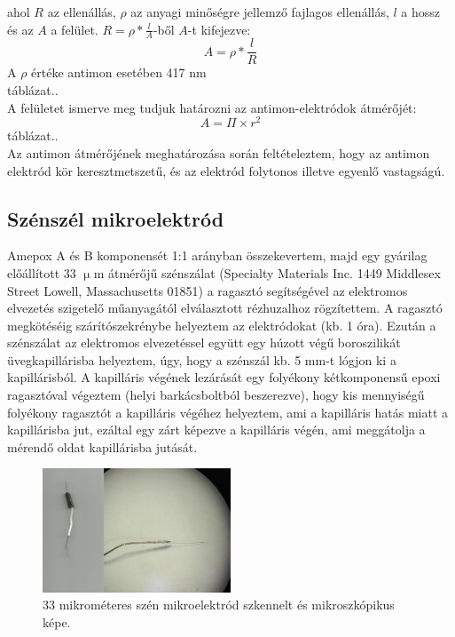 ahol $R$ az ellenállás, $\rho$ az anyagi minőségre jellemző fajlagos ellenállás, $l$ a hossz és az $A$ a felület. $R = \rho * \frac{l}{A}$-ből $A$-t kifejezve:
\begin{equation}
A = \rho * \frac{l}{R}
\end{equation}
A $\rho$ értéke antimon esetében 417 n\Omega m\\
táblázat..\\
A felületet ismerve meg tudjuk határozni az antimon-elektródok átmérőjét: \\
\begin{equation}
A = \Pi \times r^2
\end{equation}
táblázat..\\
Az antimon átmérőjének meghatározása során feltételeztem, hogy az antimon elektród kör keresztmetszetű, és az elektród folytonos illetve egyenlő vastagságú.

\subsection{Szénszél mikroelektród}
Amepox A és B komponensét 1:1 arányban összekevertem, majd egy gyárilag előállított 33 $\upmu$m átmérőjű szénszálat (Specialty Materials Inc. 1449 Middlesex Street Lowell, Massachusetts 01851) a ragasztó segítségével az elektromos elvezetés szigetelő műanyagától elválasztott rézhuzalhoz rögzítettem. A ragasztó megkötéséig szárítószekrénybe helyeztem az elektródokat (kb. 1 óra). Ezután a szénszálat az elektromos elvezetéssel együtt egy húzott végű boroszilikát üvegkapillárisba helyeztem, úgy, hogy a szénszál kb. 5 mm-t lógjon ki a kapillárisból. A kapilláris végének lezárását egy folyékony kétkomponensű epoxi ragasztóval végeztem (helyi barkácsboltból beszerezve), hogy kis mennyiségű folyékony ragasztót a kapilláris végéhez helyeztem, ami a kapilláris hatás miatt a kapillárisba jut, ezáltal egy zárt képezve a kapilláris végén, ami meggátolja a mérendő oldat kapillárisba jutását.
\begin{figure}[h]
\centering
\includegraphics[width=0.5\textwidth]{img/szen33.png}
\caption{33 mikrométeres szén mikroelektród szkennelt és mikroszkópikus képe.}
\label{fig:ionophores}
\end{figure}

